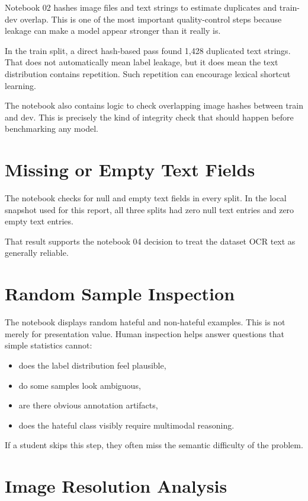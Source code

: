 \documentclass[11pt,a4paper]{report}
\begin{document}
Notebook 02 hashes image files and text strings to estimate duplicates and train-dev overlap. This is one of the most important quality-control steps because leakage can make a model appear stronger than it really is.

In the train split, a direct hash-based pass found 1,428 duplicated text strings. That does not automatically mean label leakage, but it does mean the text distribution contains repetition. Such repetition can encourage lexical shortcut learning.

The notebook also contains logic to check overlapping image hashes between train and dev. This is precisely the kind of integrity check that should happen before benchmarking any model.

\section{Missing or Empty Text Fields}

The notebook checks for null and empty text fields in every split. In the local snapshot used for this report, all three splits had zero null text entries and zero empty text entries.

That result supports the notebook 04 decision to treat the dataset OCR text as generally reliable.

\section{Random Sample Inspection}

The notebook displays random hateful and non-hateful examples. This is not merely for presentation value. Human inspection helps answer questions that simple statistics cannot:

\begin{itemize}
\item does the label distribution feel plausible,
\item do some samples look ambiguous,
\item are there obvious annotation artifacts,
\item does the hateful class visibly require multimodal reasoning.
\end{itemize}

If a student skips this step, they often miss the semantic difficulty of the problem.

\section{Image Resolution Analysis}
\end{document}
